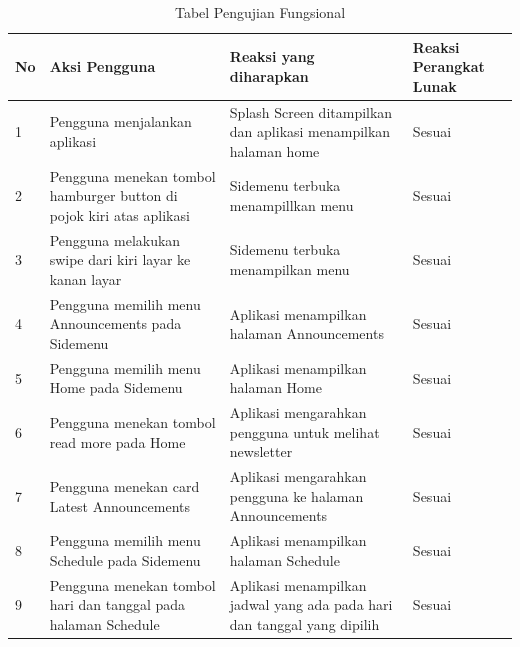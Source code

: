 \begin{table}[H]
\caption{Tabel Pengujian Fungsional}
\label{table:tabelPengujianFungsional}
\begin{tabular}{|p{0.3cm}|p{5.7cm}|p{5.7cm}|p{3cm}|}
\hline
No & Aksi Pengguna                                                                      & Reaksi yang diharapkan                                                               & Reaksi Perangkat Lunak \\ \hline
1  & Pengguna menjalankan aplikasi                                                      & Splash Screen ditampilkan dan aplikasi menampilkan halaman home                      & Sesuai                 \\ \hline
2  & Pengguna menekan tombol hamburger button di pojok kiri atas aplikasi               & Sidemenu terbuka menampillkan menu                                                    & Sesuai                 \\ \hline
3  & Pengguna melakukan swipe dari kiri layar ke kanan layar                            & Sidemenu terbuka menampilkan menu                                                     & Sesuai                 \\ \hline
4  & Pengguna memilih menu Announcements pada Sidemenu                                   & Aplikasi menampilkan halaman Announcements                                         & Sesuai                 \\ \hline
5  & Pengguna memilih menu Home pada Sidemenu                                            & Aplikasi menampilkan halaman Home                                                    & Sesuai                 \\ \hline
6  & Pengguna menekan tombol read more pada Home                                        & Aplikasi mengarahkan pengguna untuk melihat newsletter                               & Sesuai                 \\ \hline
7  & Pengguna menekan card Latest Announcements                                         & Aplikasi mengarahkan pengguna ke halaman Announcements                                & Sesuai                 \\ \hline
8  & Pengguna memilih menu Schedule pada Sidemenu                                        & Aplikasi menampilkan halaman Schedule                                                & Sesuai                 \\ \hline
9  & Pengguna menekan tombol hari dan tanggal pada halaman Schedule                     & Aplikasi menampilkan jadwal yang ada pada hari dan tanggal yang dipilih              & Sesuai                 \\ \hline

\end{tabular}
\end{table}
